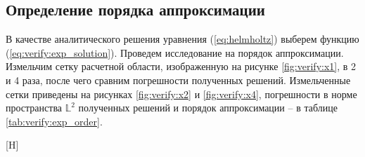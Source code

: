 \documentclass[a4paper,14pt]{article}
\makeatletter
\renewenvironment{figure}[1][\fps@figure]{
  \edef\@tempa{\noexpand\@float{figure}[#1]}
  \@tempa
  \addtocounter{foofigure}{1}
}{
  \end@float
}
\makeatother
\begin{document}
\subsection{Определение порядка аппроксимации}

В качестве аналитического решения уравнения (\ref{eq:helmholtz}) выберем функцию (\ref{eq:verify:exp_solution}). Проведем исследование на порядок аппроксимации. Измельчим сетку расчетной области, изображенную на рисунке \ref{fig:verify:x1}, в 2 и 4 раза, после чего сравним погрешности полученных решений. Измельченные сетки приведены на рисунках \ref{fig:verify:x2} и \ref{fig:verify:x4}, погрешности в норме пространства $\mathbb{L}^2$ полученных решений и порядок аппроксимации -- в таблице \ref{tab:verify:exp_order}.

\begin{figure}[H]
	\centering
	~~~~~
	\caption{конечноэлементные сетки для определения порядка аппроксимации}
	\label{fig:verify:x2_x4}
\end{figure}
\end{document}
